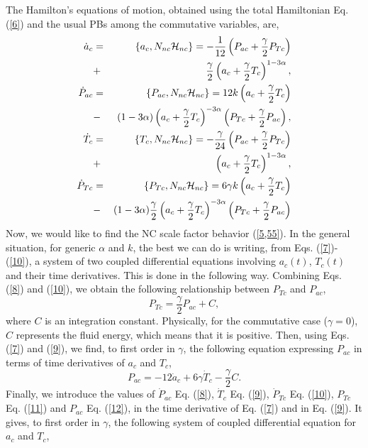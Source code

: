 \documentclass[12pt]{article}
\newcommand{\be}{\begin{equation}}
\newcommand{\ee}{\end{equation}}
\newcommand{\ea}{\end{eqnarray}}
\newcommand{\ba}{\begin{eqnarray}}
\newcommand{\0}{{(0)}}
\newcommand{\1}{{(1)}}
\newcommand{\2}{{(2)}}
\begin{document}
{The Hamilton's equations of motion, obtained using the total Hamiltonian Eq. (\ref{6}) and the
usual PBs among the commutative variables, are,
\ba
\dot a_c &=& \left\{a_c, N_{nc}{\cal{H}}_{nc}\right\} = -\frac{1}{12}\left(P_{ac} + \frac{\gamma}{2}P_{Tc}\right)\nonumber\\ 
&+& \frac{\gamma}{2}\left(a_c + \frac{\gamma}{2}T_c\right)^{1-3\alpha},\label{7}\\
\dot P_{ac} &=& \left\{P_{ac}, N_{nc}{\cal{H}}_{nc}\right\} = 12k\left( a_c + \frac{\gamma}{2}T_c \right)\nonumber\\
&-& (1 - 3\alpha)\left(a_c + \frac{\gamma}{2}T_c\right)^{-3\alpha}\left(P_{Tc} + \frac{\gamma}{2}P_{ac}\right),\label{8}\\
\dot T_c &=& \left\{T_c, N_{nc}{\cal{H}}_{nc}\right\} = -\frac{\gamma}{24}\left( P_{ac} + \frac{\gamma}{2}P_{Tc} \right) \nonumber\\
&+& \left(a_c + \frac{\gamma}{2}T_c\right)^{1-3\alpha},\label{9}\\
\dot P_{Tc} &=& \left\{P_{Tc}, N_{nc}{\cal{H}}_{nc}\right\} = 6\gamma k\left( a_c + \frac{\gamma}{2}T_c\right)\nonumber\\
&-& (1 - 3\alpha)\frac{\gamma}{2}\left(a_c + \frac{\gamma}{2}T_c\right)^{-3\alpha}\left(P_{Tc} + \frac{\gamma}{2}P_{ac}\right)
\label{10}
\ea
Now, we would like to find the NC scale factor behavior (\ref{5,55}). In the general situation, for generic $\alpha$ and $k$, the best we can
do is writing, from Eqs. (\ref{7})-(\ref{10}), a system of two coupled differential equations involving $a_c(t)$, $T_c(t)$
and their time derivatives. This is done in the following way. Combining Eqs. (\ref{8}) and (\ref{10}), we obtain the following
relationship between $P_{Tc}$ and $P_{ac}$,
\be
\label{11}
P_{Tc} = \frac{\gamma}{2}P_{ac} + C,
\ee
where $C$ is an integration constant. Physically, for the commutative case ($\gamma=0$), $C$ represents the fluid energy, which means 
that it is positive. Then, using Eqs. (\ref{7}) and (\ref{9}), we find, to first order in $\gamma$, the following equation
expressing $P_{ac}$ in terms of time derivatives of $a_c$ and $T_c$,
\be
\label{12}
P_{ac} = -12\dot a_c + 6\gamma\dot T_c - \frac{\gamma}{2}C.
\ee
Finally, we introduce the values of $\dot P_{ac}$ Eq. (\ref{8}), $\dot T_c$ Eq. (\ref{9}), $\dot P_{Tc}$ Eq. (\ref{10}), 
$P_{Tc}$ Eq. (\ref{11}) and $P_{ac}$ Eq. (\ref{12}), in the time derivative of Eq. (\ref{7}) and in Eq. (\ref{9}). It gives, to first
order in $\gamma$, the following system of coupled differential equation for $a_c$ and $T_c$,
\begin{eqnarray}

\end{eqnarray}}
\end{document}

